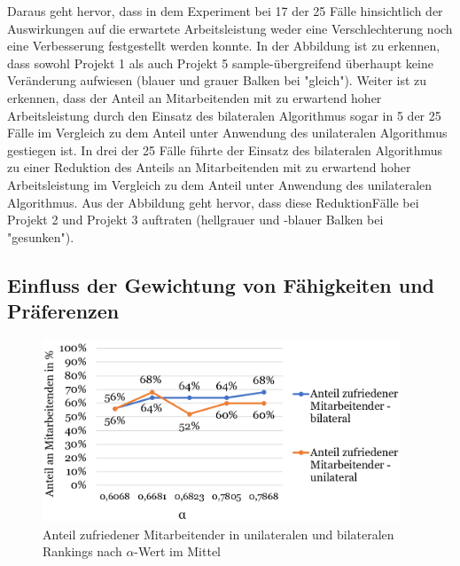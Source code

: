 Daraus geht hervor, dass in dem Experiment bei 17 der 25 Fälle hinsichtlich der Auswirkungen auf die erwartete Arbeitsleistung weder eine Verschlechterung noch eine Verbesserung festgestellt werden konnte.
In der Abbildung ist zu erkennen, dass sowohl Projekt 1 als auch Projekt 5 sample-übergreifend überhaupt keine Veränderung aufwiesen (blauer und grauer Balken bei "gleich").
Weiter ist zu erkennen, dass der Anteil an Mitarbeitenden mit zu erwartend hoher Arbeitsleistung durch den Einsatz des bilateralen Algorithmus sogar in 5 der 25 Fälle im Vergleich zu dem Anteil unter Anwendung des unilateralen Algorithmus gestiegen ist.
In drei der 25 Fälle führte der Einsatz des bilateralen Algorithmus zu einer Reduktion des Anteils an Mitarbeitenden mit zu erwartend hoher Arbeitsleistung im Vergleich zu dem Anteil unter Anwendung des unilateralen Algorithmus.
Aus der Abbildung geht hervor, dass diese ReduktionFälle bei Projekt 2 und Projekt 3 auftraten (hellgrauer und -blauer Balken bei "gesunken").

\subsection{Einfluss der Gewichtung von Fähigkeiten und Präferenzen}

\begin{figure}[H]
    \centering
	\includegraphics[width=0.95\textwidth]{gfx/verhaeltnis-z-nach-alpha.png}
	\caption[Anteil zufriedener Mitarbeitender in unilateralen und bilateralen Rankings nach $\alpha$-Wert im Mittel]{Anteil zufriedener Mitarbeitender in unilateralen und bilateralen Rankings nach $\alpha$-Wert im Mittel}
	\label{fig:ergebnisse:abb12}
\end{figure}


